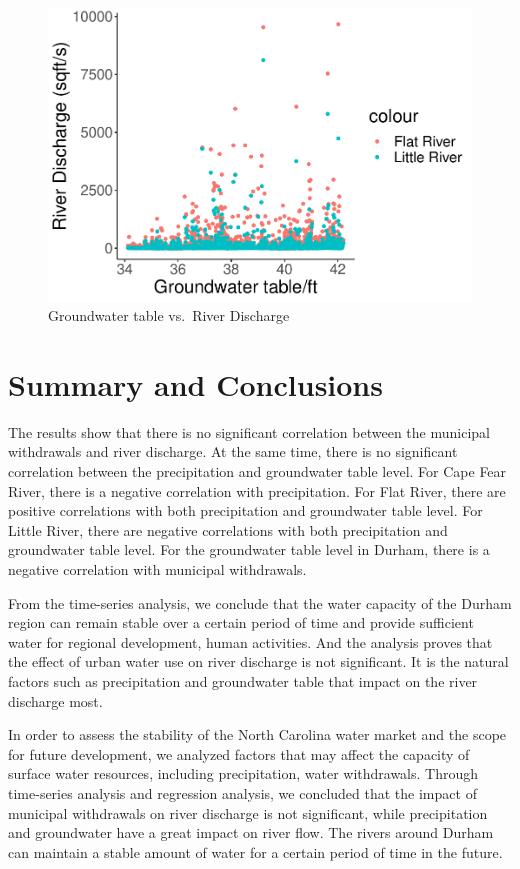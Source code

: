 \documentclass[
  12pt,
]{article}
\begin{document}
\begin{figure}
\centering
\includegraphics{Project_files/figure-latex/m5.2-1.pdf}
\caption{Groundwater table vs.~River Discharge}
\end{figure}

\newpage

\hypertarget{summary-and-conclusions}{%
\section{Summary and Conclusions}\label{summary-and-conclusions}}

The results show that there is no significant correlation between the
municipal withdrawals and river discharge. At the same time, there is no
significant correlation between the precipitation and groundwater table
level. For Cape Fear River, there is a negative correlation with
precipitation. For Flat River, there are positive correlations with both
precipitation and groundwater table level. For Little River, there are
negative correlations with both precipitation and groundwater table
level. For the groundwater table level in Durham, there is a negative
correlation with municipal withdrawals.

From the time-series analysis, we conclude that the water capacity of
the Durham region can remain stable over a certain period of time and
provide sufficient water for regional development, human activities. And
the analysis proves that the effect of urban water use on river
discharge is not significant. It is the natural factors such as
precipitation and groundwater table that impact on the river discharge
most.

In order to assess the stability of the North Carolina water market and
the scope for future development, we analyzed factors that may affect
the capacity of surface water resources, including precipitation, water
withdrawals. Through time-series analysis and regression analysis, we
concluded that the impact of municipal withdrawals on river discharge is
not significant, while precipitation and groundwater have a great impact
on river flow. The rivers around Durham can maintain a stable amount of
water for a certain period of time in the future.
\end{document}
